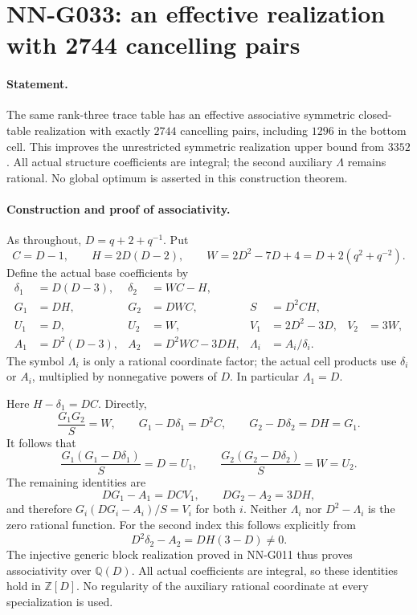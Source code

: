 \section{NN-G033: an effective realization with 2744 cancelling pairs}
\paragraph{Statement.}
The same rank-three trace table has an effective associative
symmetric closed-table realization with exactly $2744$
cancelling pairs, including $1296$ in the bottom cell.
This improves the unrestricted symmetric realization upper
bound from $3352$. All actual structure coefficients are
integral; the second auxiliary $\Lambda$ remains rational.
No global optimum is asserted in this construction theorem.

\paragraph{Construction and proof of associativity.}
As throughout, $D=q+2+q^{-1}$. Put
\[
 C=D-1,\qquad H=2D(D-2),\qquad
 W=2D^2-7D+4=D+2(q^2+q^{-2}).
\]
Define the actual base coefficients by
\[
 \begin{aligned}
 \delta_1&=D(D-3),&\delta_2&=WC-H,\\
 G_1&=DH,&G_2&=DWC,&S&=D^2CH,\\
 U_1&=D,&U_2&=W,&V_1&=2D^2-3D,&V_2&=3W,\\
 A_1&=D^2(D-3),&A_2&=D^2WC-3DH,&
 \Lambda_i&=A_i/\delta_i.
 \end{aligned}                                                       \tag{G033.1}
\]
The symbol $\Lambda_i$ is only a rational coordinate
factor; the actual cell products use $\delta_i$ or
$A_i$, multiplied by nonnegative powers of $D$.
In particular $\Lambda_1=D$.

Here $H-\delta_1=DC$. Directly,
\[
 \frac{G_1G_2}{S}=W,\qquad
 G_1-D\delta_1=D^2C,\qquad
 G_2-D\delta_2=DH=G_1.
\]
It follows that
\[
 \frac{G_1(G_1-D\delta_1)}S=D=U_1,
 \qquad
 \frac{G_2(G_2-D\delta_2)}S=W=U_2.
\]
The remaining identities are
\[
 DG_1-A_1=DCV_1,\qquad DG_2-A_2=3DH,
\]
and therefore $G_i(DG_i-A_i)/S=V_i$ for both $i$.
Neither $\Lambda_i$ nor $D^2-\Lambda_i$ is the zero
rational function. For the second index this follows
explicitly from
\[
 D^2\delta_2-A_2=DH(3-D)\ne0.
\]
The injective generic block realization proved in
NN-G011 thus proves associativity over $\mathbb Q(D)$.
All actual coefficients are integral, so these identities
hold in $\mathbb Z[D]$. No regularity of the auxiliary
rational coordinate at every specialization is used.

